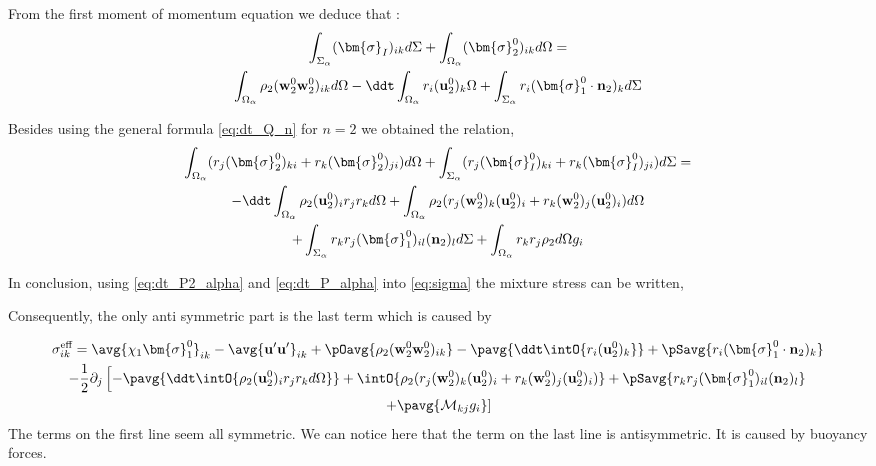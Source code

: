 From the first  moment of momentum equation we deduce that : 
\begin{multline}
    \int_{\Sigma_\alpha} 
    (\bm{\sigma}_I)_{ik}
    d\Sigma
    +\int_{\Omega_\alpha} 
    (\bm{\sigma}_2^0)_{ik}
    d\Omega
    = \\
    \int_{\Omega_\alpha} \rho_2 
    (\textbf{w}_2^0\textbf{w}_2^0  )_{ik}
    d\Omega
    -\ddt \int_{\Omega_\alpha} r_i (\textbf{u}^0_2)_k \Omega
    +\int_{\Sigma_\alpha} 
     r_i (\bm{\sigma}_1^0 \cdot \textbf{n}_2)_{k}
    d\Sigma
    \label{eq:dt_P_alpha}
\end{multline}

Besides using the general formula \ref{eq:dt_Q_n} for $n = 2$ we obtained the relation, 
\begin{multline}
    \int_{\Omega_\alpha} (r_{j}(\bm{\sigma}^0_2)_{ki}+r_{k}(\bm{\sigma}^0_2)_{ji})d\Omega
    +\int_{\Sigma_\alpha} (r_{j}(\bm{\sigma}^0_I)_{ki}+r_{k}(\bm{\sigma}_I^0)_{ji})d\Sigma
    = \\
    - \ddt\int_{\Omega_\alpha} \rho_2 (\textbf{u}_2^0)_i r_j r_k d\Omega
    + \int_{\Omega_\alpha} \rho_2 (r_{j} (\textbf{w}_2^0)_k (\textbf{u}^0_2)_i + r_k (\textbf{w}_2^0)_j (\textbf{u}^0_2)_i)d\Omega\\
    +\int_{\Sigma_\alpha}  r_{k}r_{j} (\bm{\sigma}_1^0)_{il} (\textbf{n}_2)_l d\Sigma
    + \int_{\Omega_\alpha} r_{k}r_{j}  \rho_2 d\Omega g_i
    \label{eq:dt_P2_alpha}
\end{multline}

In conclusion, using \ref{eq:dt_P2_alpha} and \ref{eq:dt_P_alpha} into \ref{eq:sigma} the mixture stress can be written,

Consequently, the only anti symmetric part is the last term which is caused by

\begin{multline*}
    \sigma_{ik}^\text{eff}
    = \avg{\chi_1 \bm{\sigma}^0_1}_{ik} 
    - \avg{\textbf{u}'\textbf{u}'}_{ik}
    + \pOavg{ \rho_2 (\textbf{w}_2^0\textbf{w}_2^0  )_{ik}}
    -\pavg{\ddt \intO{ r_i (\textbf{u}^0_2)_k }}
    +\pSavg{ r_i (\bm{\sigma}_1^0 \cdot \textbf{n}_2)_{k}}\\
    - \frac{1}{2}\partial_j \left[
        - \pavg{
        \ddt \intO{ \rho_2 (\textbf{u}_2^0)_i r_j r_k d\Omega}}
            + \intO{\rho_2 (r_{j} (\textbf{w}_2^0)_k (\textbf{u}^0_2)_i + r_k (\textbf{w}_2^0)_j (\textbf{u}^0_2)_i)} 
            + \pSavg{ r_{k}r_{j} (\bm{\sigma}_1^0)_{il} (\textbf{n}_2)_l }
                \right. \\ \left.
                + \pavg{\mathcal{M}_{kj}   g_i}
    \right]
\end{multline*}
The terms on the first line seem all symmetric. 
We can notice here that the term on the last line is antisymmetric. 
It is caused by buoyancy forces. 



